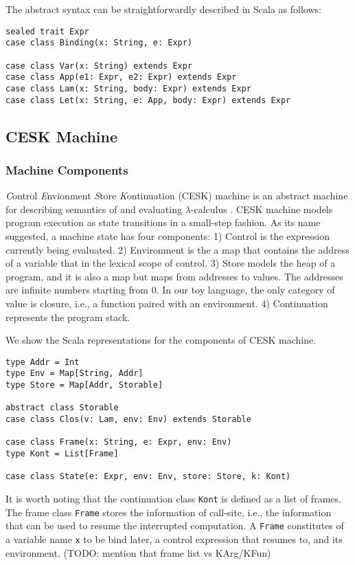 \documentclass[acmsmall,review,anonymous]{acmart}\settopmatter{printfolios=true,printccs=false,printacmref=false}
\begin{document}
The abstract syntax can be straightforwardly described in Scala as follows:

\begin{verbatim}
sealed trait Expr
case class Binding(x: String, e: Expr)

case class Var(x: String) extends Expr
case class App(e1: Expr, e2: Expr) extends Expr
case class Lam(x: String, body: Expr) extends Expr
case class Let(x: String, e: App, body: Expr) extends Expr
\end{verbatim}

\subsection{CESK Machine} \label{cesk}

\subsubsection{Machine Components}

\textit{C}ontrol \textit{E}nvionment \textit{S}tore \textit{K}ontinuation (CESK) machine is an
abstract machine for describing semantics of and evaluating $\lambda$-calculus \cite{felleisen1987calculus}.
CESK machine models program execution as state transitions in a small-step fashion. As its name suggested,
a machine state has four components: 1) Control is the expression currently being evaluated.
2) Environment is the a map that contains the address of a variable that in the lexical
scope of control.
3) Store models the heap of a program, and it is also a map but maps from addresses to values.
The addresses are infinite numbers starting from 0.
In our toy language, the only category of value is closure, i.e., a function paired with an environment.
4) Continuation represents the program stack.

We show the Scala representations for the components of CESK machine.

\begin{verbatim}
type Addr = Int
type Env = Map[String, Addr]
type Store = Map[Addr, Storable]

abstract class Storable
case class Clos(v: Lam, env: Env) extends Storable

case class Frame(x: String, e: Expr, env: Env)
type Kont = List[Frame]

case class State(e: Expr, env: Env, store: Store, k: Kont)
\end{verbatim}

It is worth noting that the continuation class \texttt{Kont} is defined as a list of frames.
The frame class \texttt{Frame} stores the information of call-site, i.e., the information that
can be used to resume the interrupted computation.
A \texttt{Frame} constitutes of a variable name \texttt{x} to be bind later, a control expression
that resumes to, and its environment. (TODO: mention that frame list vs KArg/KFun)
\end{document}
